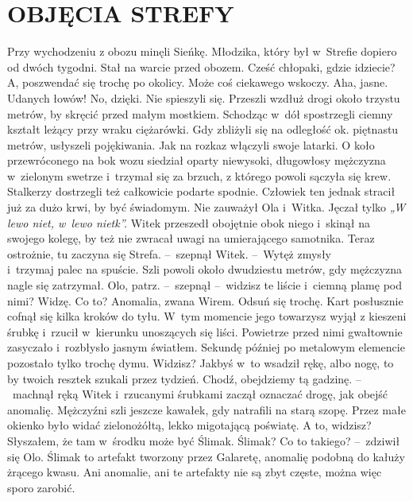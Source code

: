 \documentclass[../MAIN.tex]{subfiles}
\begin{document}
\section*{OBJĘCIA STREFY}
\mm Przy wychodzeniu z obozu minęli Sieńkę. Młodzika, który był w~Strefie dopiero od dwóch tygodni. Stał na warcie przed obozem.
\dd
\sd
\xx Cześć chłopaki, gdzie idziecie?
\xx A, poszwendać się trochę po okolicy. Może coś ciekawego wskoczy.
\xx Aha, jasne. Udanych łowów!
\xx No, dzięki.
\qd
\hspace{1ex}Nie spieszyli się. Przeszli wzdłuż drogi około trzystu metrów, by skręcić przed małym mostkiem. Schodząc w~dół spostrzegli ciemny kształt leżący przy wraku ciężarówki. Gdy zbliżyli się na odległość ok. piętnastu metrów, usłyszeli pojękiwania. Jak na rozkaz włączyli swoje latarki. O koło przewróconego na bok wozu siedział oparty niewysoki, długowłosy mężczyzna w~zielonym swetrze i~trzymał się za brzuch, z którego powoli sączyła się krew. Stalkerzy dostrzegli też całkowicie podarte spodnie. Człowiek ten jednak stracił już za dużo krwi, by być świadomym. Nie zauważył Ola i~Witka. Jęczał tylko \textit{„W lewo niet, w~lewo niet\3k”.}
\pp
Witek przeszedł obojętnie obok niego i~skinął na swojego kolegę, by też nie zwracał uwagi na umierającego samotnika.
\dd
\sd
\xx Teraz ostrożnie, tu zaczyna się Strefa. --~szepnął Witek. --~Wytęż zmysły\\ i~trzymaj palec na spuście.
\qd
\hspace{7em}Szli powoli około dwudziestu metrów, gdy mężczyzna nagle się zatrzymał.
\dd
\sd
\xx Olo, patrz. --~szepnął --~widzisz te liście i~ciemną plamę pod nimi?
\xx Widzę. Co to?
\xx Anomalia, zwana Wirem. Odsuń się trochę.
\qd
\hspace{20.6em}Kart posłusznie cofnął się kilka kroków do tyłu. W~tym momencie jego towarzysz wyjął z kieszeni śrubkę i~rzucił w~kierunku unoszących się liści. Powietrze przed nimi gwałtownie zasyczało i~rozbłysło jasnym światłem. Sekundę później po metalowym elemencie pozostało tylko trochę dymu.
\dd
\sd
\xx Widzisz? Jakbyś w~to wsadził rękę, albo nogę, to by twoich resztek szukali przez tydzień. Chodź, obejdziemy tą gadzinę. --~machnął ręką Witek i~rzucanymi śrubkami zaczął oznaczać drogę, jak obejść anomalię.
\qd
\hspace{20.5em} Mężczyźni szli jeszcze kawałek, gdy natrafili na starą szopę. Przez małe okienko było widać zielonożółtą, lekko migotającą poświatę.
\dd
\sd
\xx A to, widzisz? Słyszałem, że tam w~środku może być Ślimak.
\xx Ślimak? Co to takiego? --~zdziwił się Olo.
\xx Ślimak to artefakt tworzony przez Galaretę, anomalię podobną do kałuży żrącego kwasu. Ani anomalie, ani te artefakty nie są zbyt częste, można więc sporo zarobić.
\end{document}
